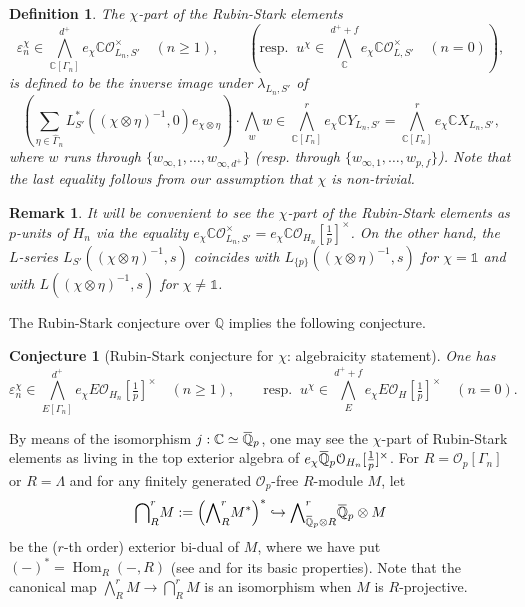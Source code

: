 \documentclass[12pt]{amsart}
\newcommand\bC{\mathbb{C}}
\newcommand\bQ{\mathbb{Q}}
\newcommand\cO{\mathcal{O}}
\newcommand{\ob}[1]{\mkern 1.5mu\overline{\mkern-1.5mu#1\mkern-1.5mu}\mkern 1.5mu}
\DeclareMathOperator{\Hom}{Hom}
\theoremstyle{defstyle}
\newtheorem{definition}[subsubsection]{Definition}
\newtheorem{remark}[subsubsection]{Remark}
\theoremstyle{thmstyle}
\newtheorem{conjecture}[subsubsection]{Conjecture}
\begin{document}
\begin{definition}
The $\chi$-part of the Rubin-Stark elements
$$\varepsilon^\chi_n \in {\bigwedge}^{d^+}_{\bC[\Gamma_n]} e_{\chi} \bC\cO^\times_{L_n,S'} \quad (n\geq 1), \qquad \left(\textrm{resp. } \ u^\chi \in {\bigwedge}^{d^++f}_{\bC} e_\chi \bC\cO^\times_{L,S'} \quad (n=0)\right), $$
 is defined to be the inverse image under $\lambda_{{L_n},S'}$ of 
 $$\left(\sum_{\eta \in \widehat{\Gamma}_n}L^{*}_{S'}({(\chi\otimes\eta)^{-1}},0) e_{\chi\otimes \eta}\right)\cdot \bigwedge_w w \in {\bigwedge}^{r}_{\bC[\Gamma_n]}e_{\chi}\bC Y_{L_n,S'}={\bigwedge}^{r}_{\bC[\Gamma_n]}e_{\chi}\bC X_{L_n,S'},$$
 where $w$ runs through $\{w_{\infty,1},\ldots,w_{\infty,d^+}\}$ (resp. through $\{w_{\infty,1},\ldots,w_{p,f}\}$).
 Note that the last equality follows from our assumption that $\chi$ is non-trivial.
\end{definition}
\begin{remark}\label{rem:RS_elts_are_p_units}
It will be convenient to see the $\chi$-part of the Rubin-Stark elements as $p$-units of $H_n$ via the equality $e_\chi\bC\cO_{L_n,S'}^\times = e_\chi\bC\cO_{H_n}[\tfrac{1}{p}]^\times$. On the other hand, the $L$-series $L_{S'}((\chi\otimes\eta)^{-1},s)$ coincides with $L_{\{p\}}((\chi\otimes\eta)^{-1},s)$ for $\chi=\mathds{1}$ and with $L((\chi\otimes\eta)^{-1},s)$ for $\chi\neq\mathds{1}$.
\end{remark} 
The Rubin-Stark conjecture over $\bQ$ \cite[Conjecture A']{rubinstark} implies the following conjecture.

\begin{conjecture}[Rubin-Stark conjecture for $\chi$: algebraicity statement]\label{conj:rubinstark_alg}
One has 
$$\varepsilon_n^\chi \in {\bigwedge}^{d^+}_{E[\Gamma_n]} e_{\chi} E\cO_{H_n}[\tfrac{1}{p}]^\times \quad (n\geq 1), \qquad \textrm{resp. } \ u^\chi \in {\bigwedge}^{d^++f}_{E} e_\chi E\cO_{H}[\tfrac{1}{p}]^\times \quad (n=0).
$$
\end{conjecture}

By means of the isomorphism $j : \bC \simeq \ob{\bQ}_p$, one may see the $\chi$-part of Rubin-Stark elements as living in the top exterior algebra of $e_\chi \ob{\bQ}_p\cO_{H_n}[\tfrac{1}{p}]^\times$. For $R=\cO_p[\Gamma_n]$ or $R=\Lambda$ and for any finitely generated $\cO_p$-free $R$-module $M$, let 
$${\bigcap}^r_{R}M := \left({\bigwedge}^r_{R}M^*\right)^* \hookrightarrow {\bigwedge}^r_{\ob{\bQ}_p\otimes R}\ob{\bQ}_p \otimes M $$
be the ($r$-th order) exterior bi-dual of $M$, where we have put $(-)^*=\Hom_{R}(-,R)$ (see \cite[§4]{BKSDocumenta} and \cite[Appendix B]{buyukboduksakamoto} for its basic properties). Note that the canonical map ${\bigwedge}^r_{R}M \longrightarrow{\bigcap}^r_{R}M$ is an isomorphism when $M$ is $R$-projective.
\end{document}

